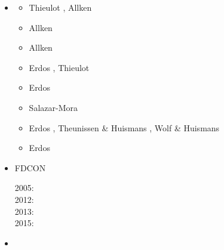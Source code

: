 \begin{itemize}
\item \fantom {}

\begin{scriptsize}
\begin{itemize}
\item[\twothousandeleven]   Thieulot \cite{thie11}, Allken \etal \cite{alht11}
\item[\twothousandtwelve]   Allken \etal \cite{alht12}
\item[\twothousandthirteen] Allken \etal \cite{alhf13}
\item[\twothousandfourteen] Erdos \etal \cite{erhv14}, Thieulot \etal \cite{thsh14}
\item[\twothousandfifteen]  Erdos \etal \cite{erhv15}
\item[\twothousandeighteen] Salazar-Mora \etal \cite{sahf18}
\item[\twothousandnineteen] Erdos \etal \cite{erhv19}, Theunissen \& Huismans \cite{thhu19}, 
                            Wolf \& Huismans \cite{wohu19}
\item[\twothousandtwentyone] Erdos \etal \cite{erhf21}
\end{itemize}
\end{scriptsize}

\item FDCON 

\begin{scriptsize}
2005: \cite{enbs05}\\
2012: \cite{crsg12}\\
2013: \cite{fusc13}\\
2015: \cite{fuks15}
\end{scriptsize}

\item \fluidity {}


\end{itemize}
